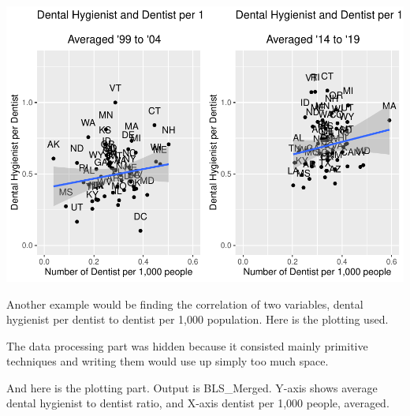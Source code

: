 \documentclass[
]{article}
\begin{document}
\includegraphics{Change_By_State_Graphic_Reproduction_files/figure-latex/unnamed-chunk-13-1.pdf}

Another example would be finding the correlation of two variables,
dental hygienist per dentist to dentist per 1,000 population. Here is
the plotting used.

The data processing part was hidden because it consisted mainly
primitive techniques and writing them would use up simply too much
space.

And here is the plotting part. Output is BLS\_Merged. Y-axis shows
average dental hygienist to dentist ratio, and X-axis dentist per 1,000
people, averaged.
\end{document}
